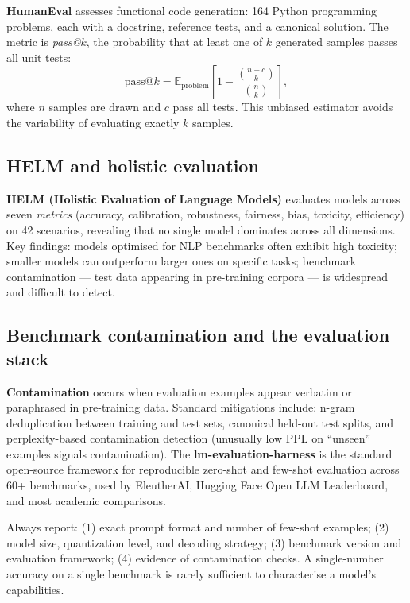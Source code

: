 \documentclass[11pt,a4paper]{article}
\begin{document}
	\textbf{HumanEval} \parencite{chen2021humaneval} assesses functional code generation: 164 Python programming problems, each with a docstring, reference tests, and a canonical solution. The metric is \emph{pass@$k$}, the probability that at least one of $k$ generated samples passes all unit tests:
	\begin{equation}
		\mathrm{pass@}k = \mathbb{E}_{\text{problem}}\!\left[1 - \frac{\binom{n-c}{k}}{\binom{n}{k}}\right],
	\end{equation}
	where $n$ samples are drawn and $c$ pass all tests. This unbiased estimator avoids the variability of evaluating exactly $k$ samples.

	\subsection{HELM and holistic evaluation}

	\textbf{HELM (Holistic Evaluation of Language Models)} \parencite{liang2022helm} evaluates models across seven \emph{metrics} (accuracy, calibration, robustness, fairness, bias, toxicity, efficiency) on 42 scenarios, revealing that no single model dominates across all dimensions. Key findings: models optimised for NLP benchmarks often exhibit high toxicity; smaller models can outperform larger ones on specific tasks; benchmark contamination --- test data appearing in pre-training corpora --- is widespread and difficult to detect.

	\subsection{Benchmark contamination and the evaluation stack}

	\textbf{Contamination} occurs when evaluation examples appear verbatim or paraphrased in pre-training data. Standard mitigations include: n-gram deduplication between training and test sets, canonical held-out test splits, and perplexity-based contamination detection (unusually low PPL on ``unseen'' examples signals contamination). The \textbf{lm-evaluation-harness} \parencite{gao2021harness} is the standard open-source framework for reproducible zero-shot and few-shot evaluation across 60+ benchmarks, used by EleutherAI, Hugging Face Open LLM Leaderboard, and most academic comparisons.

	\begin{keyconcept}
		Always report: (1) exact prompt format and number of few-shot examples; (2) model size, quantization level, and decoding strategy; (3) benchmark version and evaluation framework; (4) evidence of contamination checks. A single-number accuracy on a single benchmark is rarely sufficient to characterise a model's capabilities.
	\end{keyconcept}
\end{document}
